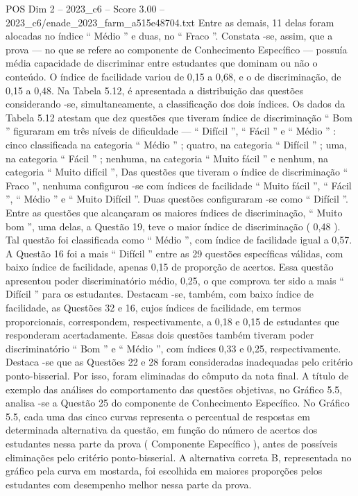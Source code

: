 \begin{textsample}{POS Dim 2 – 2023\_c6 – Score 3.00 – 2023\_c6/enade\_2023\_farm\_a515e48704.txt}
Entre as demais, 11 delas foram alocadas no índice “ Médio ” e duas, no “ Fraco ”.
Constata -se, assim, que a prova — no que se refere ao componente de Conhecimento Específico — possuía média capacidade de discriminar entre estudantes que dominam ou não o conteúdo.
O índice de facilidade variou de 0,15 a 0,68, e o de discriminação, de 0,15 a 0,48.
Na Tabela 5.12, é apresentada a distribuição das questões considerando -se, simultaneamente, a classificação dos dois índices.
Os dados da Tabela 5.12 atestam que dez questões que tiveram índice de discriminação “ Bom ” figuraram em três níveis de dificuldade — “ Difícil ”, “ Fácil ” e “ Médio ” : cinco classificada na categoria “ Médio ” ; quatro, na categoria “ Difícil ” ; uma, na categoria “ Fácil ” ; nenhuma, na categoria “ Muito fácil ” e nenhum, na categoria “ Muito difícil ”, Das questões que tiveram o índice de discriminação “ Fraco ”, nenhuma configurou -se com índices de facilidade “ Muito fácil ”, “ Fácil ”, “ Médio ” e “ Muito Difícil ”.
Duas questões configuraram -se como “ Difícil ”.
Entre as questões que alcançaram os maiores índices de discriminação, “ Muito bom ”, uma delas, a Questão 19, teve o maior índice de discriminação ( 0,48 ).
Tal questão foi classificada como “ Médio ”, com índice de facilidade igual a 0,57.
A Questão 16 foi a mais “ Difícil ” entre as 29 questões específicas válidas, com baixo índice de facilidade, apenas 0,15 de proporção de acertos.
Essa questão apresentou poder discriminatório médio, 0,25, o que comprova ter sido a mais “ Difícil ” para os estudantes.
Destacam -se, também, com baixo índice de facilidade, as Questões 32 e 16, cujos índices de facilidade, em termos proporcionais, correspondem, respectivamente, a 0,18 e 0,15 de estudantes que responderam acertadamente.
Essas dois questões também tiveram poder discriminatório “ Bom ” e “ Médio ”, com índices 0,33 e 0,25, respectivamente.
Destaca -se que as Questões 22 e 28 foram consideradas inadequadas pelo critério ponto-bisserial.
Por isso, foram eliminadas do cômputo da nota final.
A título de exemplo das análises do comportamento das questões objetivas, no Gráfico 5.5, analisa -se a Questão 25 do componente de Conhecimento Específico.
No Gráfico 5.5, cada uma das cinco curvas representa o percentual de respostas em determinada alternativa da questão, em função do número de acertos dos estudantes nessa parte da prova ( Componente Específico ), antes de possíveis eliminações pelo critério ponto-bisserial.
A alternativa correta B, representada no gráfico pela curva em mostarda, foi escolhida em maiores proporções pelos estudantes com desempenho melhor nessa parte da prova.

\end{textsample}

